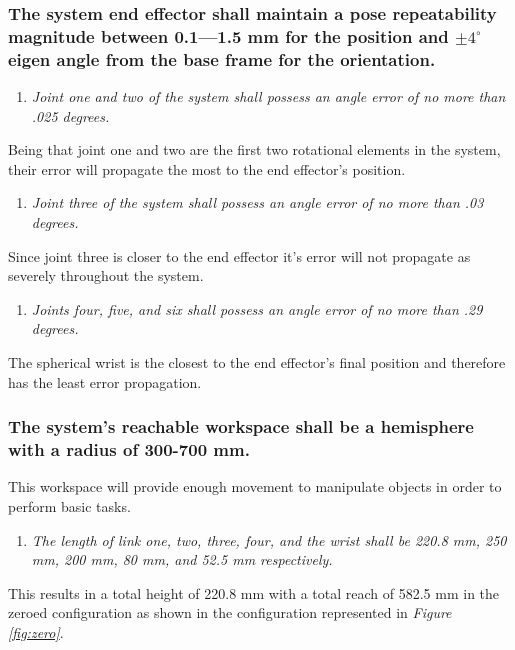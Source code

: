 \documentclass[12pt]{report}
\begin{document}
\subsubsection{The system end effector shall maintain a pose repeatability magnitude between 0.1—1.5 mm for the position and \(\pm 4^{\circ}\) eigen angle from the base frame for the orientation.}
\begin{enumerate}
  \item \textit{Joint one and two of the system shall possess an angle error of no more than .025 degrees.}
\end{enumerate}
Being that joint one and two are the first two rotational elements in the system, their error will propagate the most to the end effector's position.
\begin{enumerate}[resume]
  \item \textit{Joint three of the system shall possess an angle error of no more than .03 degrees.}
\end{enumerate}
Since joint three is closer to the end effector it's error will not propagate as severely throughout the system.
\begin{enumerate}[resume]
  \item \textit{Joints four, five, and six shall possess an angle error of no more than .29 degrees.} \\
\end{enumerate}
The spherical wrist is the closest to the end effector's final position and therefore has the least error propagation.

\subsubsection{The system’s reachable workspace shall be a hemisphere with a radius of 300-700 mm.}
This workspace will provide enough movement to manipulate objects in order to perform basic tasks.
\begin{enumerate}
  \item \textit{The length of link one, two, three, four, and the wrist shall be 220.8 mm, 250 mm, 200 mm, 80 mm, and 52.5 mm respectively.}
\end{enumerate}
  This results in a total height of 220.8 mm with a total reach of 582.5 mm in the zeroed configuration as shown in the configuration represented in \emph{Figure \ref{fig:zero}}.
\end{document}
